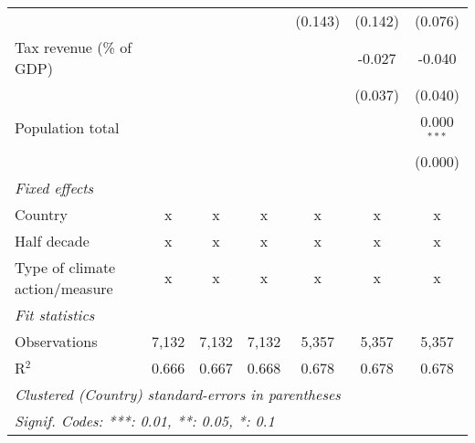 \begin{tabular}{lcccccc}
                                                      &         &                &                & (0.143)        & (0.142)        & (0.076)\\   
   Tax revenue (\% of GDP)                            &         &                &                &                & -0.027         & -0.040\\   
                                                      &         &                &                &                & (0.037)        & (0.040)\\   
   Population total                                   &         &                &                &                &                & 0.000$^{***}$\\   
                                                      &         &                &                &                &                & (0.000)\\   
   \emph{Fixed effects}\\
   Country                                            & x       & x              & x              & x              & x              & x\\  
   Half decade                                        & x       & x              & x              & x              & x              & x\\  
   Type of climate action/measure                     & x       & x              & x              & x              & x              & x\\  
   \midrule \emph{Fit statistics}\\
   Observations                                       & 7,132   & 7,132          & 7,132          & 5,357          & 5,357          & 5,357\\  
   R$^2$                                              & 0.666   & 0.667          & 0.668          & 0.678          & 0.678          & 0.678\\  
   \midrule
   \multicolumn{7}{l}{\emph{Clustered (Country) standard-errors in parentheses}}\\
   \multicolumn{7}{l}{\emph{Signif. Codes: ***: 0.01, **: 0.05, *: 0.1}}\\
\end{tabular}
\par\endgroup


